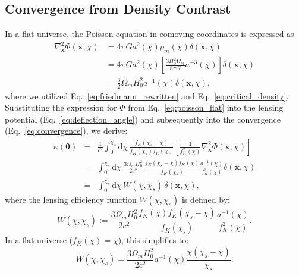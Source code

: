 \subsection{Convergence from Density Contrast}
In a flat universe, the Poisson equation in comoving coordinates is expressed as
\begin{align}
\label{eq:poisson_flat}
    \nabla_{\mathbf{x}}^2 \Phi(\mathbf{x}, \chi) &= 4\pi G a^2(\chi) \bar{\rho}_m(\chi) \delta(\mathbf{x}, \chi) \nonumber\\ 
    &= 4\pi G a^2(\chi) \left[ \frac{3 H_0^2 \Omega_m}{8 \pi G} a^{-3}(\chi) \right] \delta(\mathbf{x}, \chi) \nonumber \\ 
    &= \frac{3}{2} \Omega_m H_0^2 a^{-1}(\chi) \delta(\mathbf{x}, \chi),
\end{align}
where we utilized Eq.~\eqref{eq:friedmann_rewritten} and Eq.~\eqref{eq:critical_density}.
Substituting the expression for $\Phi$ from Eq.~\eqref{eq:poisson_flat} into the lensing potential (Eq.~\eqref{eq:deflection_angle}) and subsequently into the convergence (Eq.~\eqref{eq:convergence}), we derive:
\begin{eqnarray}
    \label{eq:convergence_integral}
    \kappa(\boldsymbol{\theta}) 
    &=& \frac{1}{c^2} \int_0^{\chi_s} \mathrm{d}\chi \, \frac{f_K(\chi_s - \chi)}{f_K(\chi_s) f_K(\chi)} \left[ \frac{1}{f_K^2(\chi)} \nabla_{\mathbf{x}}^2 \Phi\left(\mathbf{x}, \chi\right) \right] \nonumber \\
    &=& \int_0^{\chi_s} \mathrm{d}\chi \, \frac{3 \Omega_m H_0^2}{2 c^2} \, \frac{f_K(\chi_s - \chi) f_K(\chi)}{f_K(\chi_s)} \frac{a^{-1}(\chi)}{f_K^3(\chi)} \delta\left(\mathbf{x}, \chi\right) \nonumber \\
    &=& \int_0^{\chi_s} \mathrm{d}\chi \, W(\chi, \chi_s) \, \delta\left(\mathbf{x}, \chi\right),
\end{eqnarray}
where the lensing efficiency function $W(\chi, \chi_s)$ is defined by:
\begin{equation}
    \label{eq:lensing_efficiency}
    W(\chi, \chi_s) := \frac{3 \Omega_m H_0^2}{2 c^2} \frac{f_K(\chi) f_K(\chi_s - \chi)}{f_K(\chi_s)} \frac{a^{-1}(\chi)}{f_K^2(\chi)}.
\end{equation}
In a flat universe ($f_K(\chi) = \chi$), this simplifies to:
\begin{equation}
    \label{eq:lensing_efficiency_flat}
    W(\chi, \chi_s) = \frac{3 \Omega_m H_0^2}{2 c^2} a^{-1}(\chi) \frac{\chi (\chi_s - \chi)}{\chi_s}.
\end{equation}

